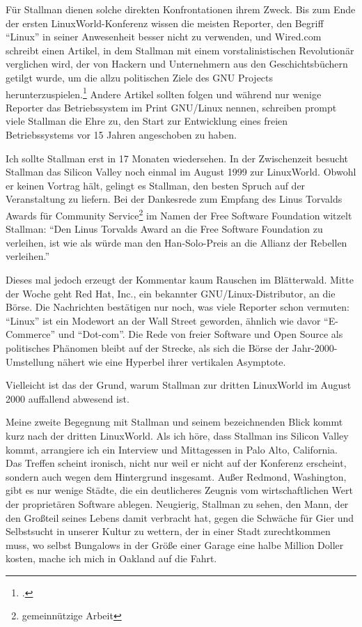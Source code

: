 Für Stallman dienen solche direkten Konfrontationen ihrem Zweck. Bis zum Ende der ersten LinuxWorld-Konferenz wissen die meisten Reporter, den Begriff "`Linux"' in seiner Anwesenheit besser nicht zu verwenden, und Wired.com schreibt einen Artikel, in dem Stallman mit einem vorstalinistischen Revolutionär verglichen wird, der von Hackern und Unternehmern aus den Geschichtsbüchern getilgt wurde, um die allzu politischen Ziele des GNU Projects herunterzuspielen.\footcite[Vgl.][]{forgotten} Andere Artikel sollten folgen und während nur wenige Reporter das Betriebssystem im Print \glq GNU/Linux\grq{} nennen, schreiben prompt viele Stallman die Ehre zu, den Start zur Entwicklung eines freien Betriebssystems vor 15 Jahren angeschoben zu haben.

Ich sollte Stallman erst in 17 Monaten wiedersehen. In der Zwischenzeit besucht Stallman das Silicon Valley noch einmal im August 1999 zur LinuxWorld. Obwohl er keinen Vortrag hält, gelingt es Stallman, den besten Spruch auf der Veranstaltung zu liefern. Bei der Dankesrede zum Empfang des Linus Torvalds Awards für Community Service\footnote{gemeinnützige Arbeit} im Namen der Free Software Foundation witzelt Stallman: "`Den Linus Torvalds Award an die Free Software Foundation zu verleihen, ist wie als würde man den Han-Solo-Preis an die Allianz der Rebellen verleihen."'

Dieses mal jedoch erzeugt der Kommentar kaum Rauschen im Blätterwald. Mitte der Woche geht Red Hat, Inc., ein bekannter GNU/Linux-Distributor, an die Börse. Die Nachrichten bestätigen nur noch, was viele Reporter schon vermuten: "`Linux"' ist ein Modewort an der Wall Street geworden, ähnlich wie davor "`E-Commerce"' und "`Dot-com"'. Die Rede von freier Software und Open Source als politisches Phänomen bleibt auf der Strecke, als sich die Börse der Jahr-2000-Umstellung nähert wie eine Hyperbel ihrer vertikalen Asymptote.

Vielleicht ist das der Grund, warum Stallman zur dritten LinuxWorld im August 2000 auffallend abwesend ist.

Meine zweite Begegnung mit Stallman und seinem bezeichnenden Blick kommt kurz nach der dritten LinuxWorld. Als ich höre, dass Stallman ins Silicon Valley kommt, arrangiere ich ein Interview und Mittagessen in Palo Alto, California. Das Treffen scheint ironisch, nicht nur weil er nicht auf der Konferenz erscheint, sondern auch wegen dem Hintergrund insgesamt. Außer Redmond, Washington, gibt es nur wenige Städte, die ein deutlicheres Zeugnis vom wirtschaftlichen Wert der proprietären Software ablegen. Neugierig, Stallman zu sehen, den Mann, der den Großteil seines Lebens damit verbracht hat, gegen die Schwäche für Gier und Selbstsucht in unserer Kultur zu wettern, der in einer Stadt zurechtkommen muss, wo selbst Bungalows in der Größe einer Garage eine halbe Million Doller kosten, mache ich mich in Oakland auf die Fahrt.

